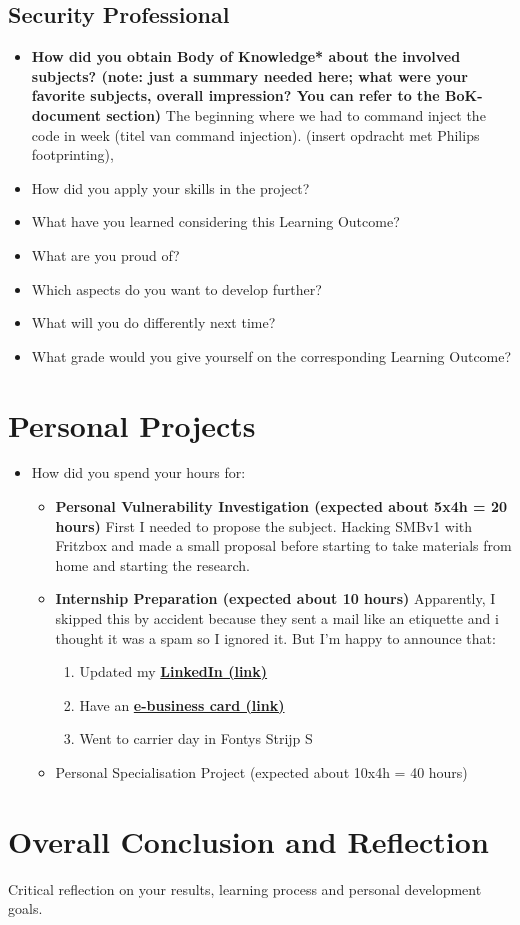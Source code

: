 \documentclass[12pt, letterpaper]{article}
\begin{document}
\subsection{Security Professional}
\begin{itemize}
\item \textbf{How did you obtain Body of Knowledge* about the involved subjects? (note: just a summary needed here; what were your favorite subjects, overall impression? You can refer to the BoK-document section)}
\hfill\break
\hfill\break
The beginning where we had to command inject the code in week (titel van command injection). (insert opdracht met Philips footprinting), 
\item How did you apply your skills in the project?
\item What have you learned considering this Learning Outcome?
\item What are you proud of?
\item Which aspects do you want to develop further?
\item What will you do differently next time?
\item What grade would you give yourself on the corresponding Learning Outcome?
\end{itemize}

\newpage
\section{Personal Projects}
\begin{itemize}
\item How did you spend your hours for:
\begin{itemize}
\item \textbf{Personal Vulnerability Investigation (expected about 5x4h = 20 hours)}
\hfill\break
\hfill\break
First I needed to propose the subject. Hacking SMBv1 with Fritzbox and made a small proposal before starting to take materials from home and starting the research.
\item \textbf{Internship Preparation (expected about 10 hours)}
\hfill\break
\hfill\break
Apparently, I skipped this by accident because they sent a mail like an etiquette and i thought it was a spam so I ignored it. But I'm happy to announce that:
\begin{enumerate}
    \item Updated my \textbf{\href{https://www.linkedin.com/in/kostapoum/}{LinkedIn (link)}}
    \item Have an \textbf{\href{https://poumpouridis.carrd.co}{ e-business card (link)}}
    \item Went to carrier day in Fontys Strijp S
\end{enumerate}
\item Personal Specialisation Project (expected about 10x4h = 40 hours)
\end{itemize}
\end{itemize}

\newpage
\section{Overall Conclusion and Reflection}
Critical reflection on your results, learning process and personal development goals.
\end{document}
